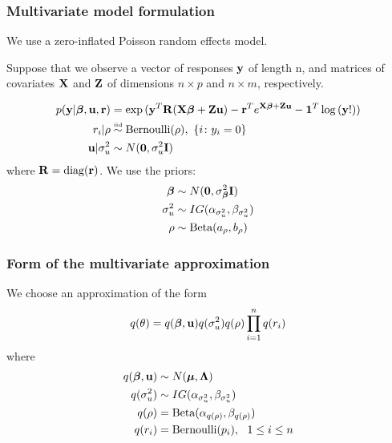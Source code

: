 \documentclass{beamer}
\begin{document}
\begin{frame}
\frametitle{Multivariate model formulation}
We use a zero-inflated Poisson random effects model.

\medskip

Suppose that we observe a vector of responses ${\bf y}$ of length n, and matrices
of covariates ${\bf X}$ and ${\bf Z}$ of dimensions $n \times p$ and $n \times m$,
respectively.

\begin{align*}
p({\bf y}|{\boldsymbol \beta}, {\bf u}, {\bf r}) &= \exp{({\bf y}^T{\bf R}({\bf X}{\boldsymbol\beta}+ {\bf Z}{\bf u}) - {\bf r}^Te^{{\bf X}{\boldsymbol\beta}+ {\bf Z}{\bf u}} - {\bf1}^T\log{({\bf y}!)})} \\
r_i|\rho & \stackrel{\mbox{\tiny iid}}{\sim} \text{Bernoulli}(\rho), \ \{i \colon y_i=0\} \\
{\bf u}|\sigma_u^2 &\sim N({\bf 0}, \sigma_u^2 {\bf I}) \\
\end{align*}
\noindent where ${\bf R} =\mbox{diag}({\bf r})$.
We use the priors:
\begin{align*}
{\boldsymbol\beta} &\sim N({\bf 0}, \sigma_{\boldsymbol \beta}^2{\bf I}) \\
\sigma_u^2 &\sim IG(\alpha_{\sigma_u^2}, \beta_{\sigma_u^2}) \\
\rho &\sim \text{Beta}(a_\rho, b_\rho) \\
\end{align*}
\end{frame}

\begin{frame}
\frametitle{Form of the multivariate approximation}
We choose an approximation of the form
$$
q(\theta) = q({\boldsymbol \beta}, {\bf u}) q(\sigma_u^2) q(\rho) \prod_{i=1}^n q(r_i)
$$
where
\begin{align*}
q({\boldsymbol \beta}, {\bf u}) &\sim N({\boldsymbol \mu}, {\boldsymbol \Lambda}) \\
q(\sigma_u^2) &\sim IG(\alpha_{\sigma_u^2}, \beta_{\sigma_u^2}) \\
q(\rho) &= \text{Beta}(\alpha_{q(\rho)}, \beta_{q(\rho)}) \\
q(r_i) &= \text{Bernoulli}(p_i), \ \ 1 \leq i \leq n
\end{align*}
\end{frame}
\end{document}
